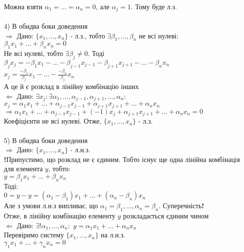 \documentclass[a4paper, 14pt]{extarticle}
\def\huge{\displaystyle}
\def\bigline{\vspace{5mm}\\}
\begin{document}
	Можна взяти $\alpha_1 = \dots = \alpha_n = 0$, але $\alpha_j = 1$. Тому буде л.з.\\
	\\
	4) В обидва боки доведення\\
	$\boxed{\Rightarrow}$ Дано: $\{x_1, \dots, x_n\}$ - л.з., тобто $\exists \beta_1, \dots, \beta_n$ не всі нулеві: \\$\beta_1 x_1 + \dots + \beta_n x_n = 0$\\
	Не всі нулеві, тобто $\exists \beta_j \neq 0$. Тоді\\
	$\beta_j x_j = -\beta_1 x_1 - \dots - \beta_{j-1} x_{j-1} - \beta_{j+1} x_{j+1} - \dots - \beta_n x_n$\\
	$\huge x_j = \frac{-\beta_1}{\beta_j}x_1 - \dots - \frac{-\beta_n}{\beta_j}x_n$\\
	А це й є розклад в лінійну комбінацію інших
	\bigline
	$\boxed{\Leftarrow}$ Дано: $\exists x_j: \exists \alpha_1, \dots, \alpha_{j-1}, \alpha_{j+1}, \dots, \alpha_n:$\\
	$x_j = \alpha_1 x_1 + \dots + \alpha_{j-1} x_{j-1} + \alpha_{j+1} x_{j+1} + \dots + \alpha_n x_n$\\
	$\Rightarrow \alpha_1 x_1 + \dots + \alpha_{j-1} x_{j-1} + (-1)x_j + \alpha_{j+1} x_{j+1} + \dots + \alpha_n x_n = 0$\\
	Коефіцієнти не всі нулеві. Отже, $\{x_1, \dots, x_n\}$ - л.з.\\
	\\
	5) В обидва боки доведення\\
	$\boxed{\Rightarrow}$ Дано: $\{x_1, \dots, x_n \}$ - л.н.з.\\
	\textbf{!}Припустимо, що розклад не є єдиним. Тобто існує ще одна лінійна комбінація для елемента $y$, тобто:\\
	$y = \beta_1 x_1 + \dots + \beta_n x_n$\\
	Тоді:\\
	$0 = y - y = (\alpha_1 - \beta_1)x_1 + \dots + (\alpha_n - \beta_n)x_n$\\
	Але з умови л.н.з випливає, що $\alpha_1 = \beta_1, \dots, \alpha_n = \beta_n$. Суперечність\textbf{!} \\ 
	Отже, в лінійну комбінацію елементу $y$ розкладається єдиним чином
	\bigline
	$\boxed{\Leftarrow}$ Дано: $\exists! \alpha_1, \dots, \alpha_n:$
	$y = \alpha_1 x_1 + \dots + \alpha_n x_n$\\
	Перевіримо систему $\{x_1, \dots, x_n\}$ на л.н.з.\\
	$\gamma_1 x_1 + \dots + \gamma_n x_n = 0$\\
\end{document}
